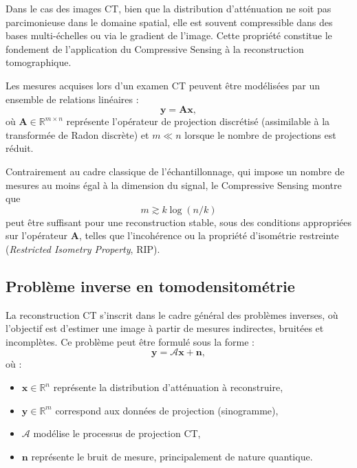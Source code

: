 Dans le cas des images CT, bien que la distribution d'atténuation ne soit pas parcimonieuse
dans le domaine spatial, elle est souvent compressible dans des bases multi-échelles ou via
le gradient de l'image. Cette propriété constitue le fondement de l'application du
Compressive Sensing à la reconstruction tomographique.

Les mesures acquises lors d'un examen CT peuvent être modélisées par un ensemble de relations
linéaires :
\begin{equation}
    \mathbf{y} = \mathbf{A}\mathbf{x},
\end{equation}
où $\mathbf{A} \in \mathbb{R}^{m \times n}$ représente l'opérateur de projection discrétisé
(assimilable à la transformée de Radon discrète) et $m \ll n$ lorsque le nombre de projections
est réduit.

Contrairement au cadre classique de l'échantillonnage, qui impose un nombre de mesures au
moins égal à la dimension du signal, le Compressive Sensing montre que
\begin{equation}
    m \gtrsim k \log(n/k)
\end{equation}
peut être suffisant pour une reconstruction stable, sous des conditions appropriées sur
l'opérateur $\mathbf{A}$, telles que l'incohérence ou la propriété d'isométrie restreinte
(\emph{Restricted Isometry Property}, RIP).

\subsection{Problème inverse en tomodensitométrie}

La reconstruction CT s'inscrit dans le cadre général des problèmes inverses, où l'objectif
est d'estimer une image à partir de mesures indirectes, bruitées et incomplètes. Ce problème
peut être formulé sous la forme :
\begin{equation}
    \mathbf{y} = \mathcal{A}\mathbf{x} + \mathbf{n},
    \label{eq:inverse_problem}
\end{equation}
où :
\begin{itemize}
    \item[-] $\mathbf{x} \in \mathbb{R}^n$ représente la distribution d'atténuation à reconstruire,
    \item[-] $\mathbf{y} \in \mathbb{R}^m$ correspond aux données de projection (sinogramme),
    \item[-] $\mathcal{A}$ modélise le processus de projection CT,
    \item[-] $\mathbf{n}$ représente le bruit de mesure, principalement de nature quantique.
\end{itemize}

